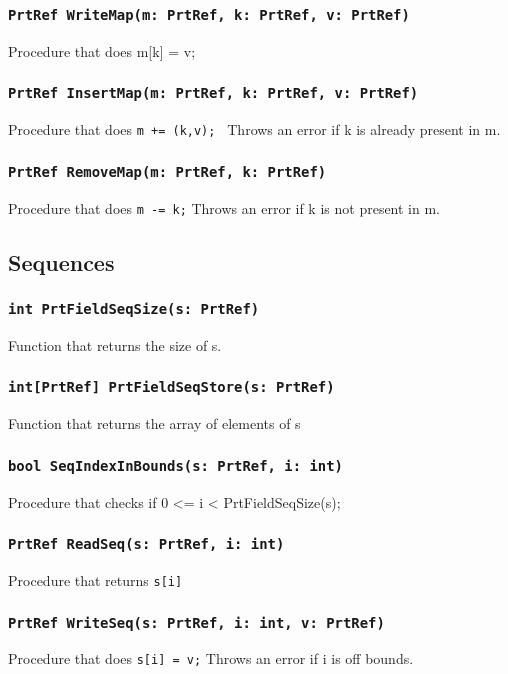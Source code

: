 \documentclass{llncs}
\begin{document}
\subsubsection{\texttt{PrtRef WriteMap(m: PrtRef, k: PrtRef, v: PrtRef)}} 
Procedure that does {m[k] = v;}
\subsubsection{\texttt{PrtRef InsertMap(m: PrtRef, k: PrtRef, v: PrtRef)}}
Procedure that does \texttt{m += (k,v); }
\newline
Throws an error if k is already present in m.
\subsubsection{\texttt{PrtRef RemoveMap(m: PrtRef, k: PrtRef)} }
Procedure that does \texttt{m -= k;}
\newline 
Throws an error if k is not present in m.
\subsection {Sequences} 
\subsubsection{\texttt{int PrtFieldSeqSize(s: PrtRef)} }
Function that returns the size of s.
\subsubsection{\texttt{int{[}PrtRef{]} PrtFieldSeqStore(s: PrtRef)}} 
Function that returns the array of elements of s
\subsubsection{\texttt{bool SeqIndexInBounds(s: PrtRef, i: int)} }
Procedure that checks if 0 <= i < PrtFieldSeqSize(s);
\subsubsection{\texttt{PrtRef ReadSeq(s: PrtRef, i: int)} }
Procedure that returns \texttt{s[i]}
\subsubsection{\texttt{PrtRef WriteSeq(s: PrtRef, i: int, v: PrtRef)}} 
Procedure that does \texttt{s[i] = v;}
\newline
Throws an error if i is off bounds.
\end{document}
